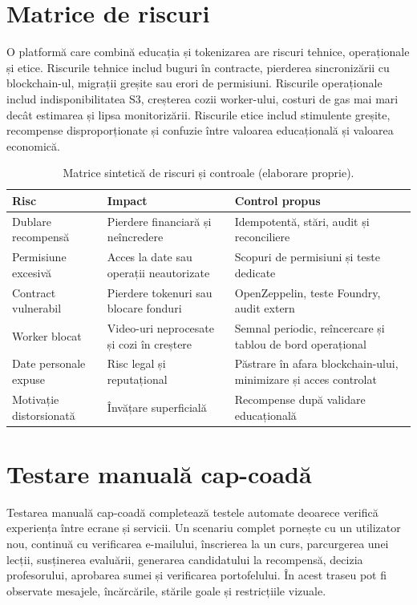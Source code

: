 \section{Matrice de riscuri}
O platformă care combină educația și tokenizarea are riscuri tehnice, operaționale și etice. Riscurile tehnice includ buguri în contracte, pierderea sincronizării cu blockchain-ul, migrații greșite sau erori de permisiuni. Riscurile operaționale includ indisponibilitatea S3, creșterea cozii worker-ului, costuri de gas mai mari decât estimarea și lipsa monitorizării. Riscurile etice includ stimulente greșite, recompense disproporționate și confuzie între valoarea educațională și valoarea economică.

\begin{table}[H]
    \centering
    \caption{Matrice sintetică de riscuri și controale (elaborare proprie).}
    \label{tab:matrice_riscuri}
    \begin{tabular}{P{3.6cm}P{4.8cm}P{5.2cm}}
        \toprule
        Risc & Impact & Control propus \\
        \midrule
        Dublare recompensă & Pierdere financiară și neîncredere & Idempotentă, stări, audit și reconciliere \\
        Permisiune excesivă & Acces la date sau operații neautorizate & Scopuri de permisiuni și teste dedicate \\
        Contract vulnerabil & Pierdere tokenuri sau blocare fonduri & OpenZeppelin, teste Foundry, audit extern \\
        Worker blocat & Video-uri neprocesate și cozi în creștere & Semnal periodic, reîncercare și tablou de bord operațional \\
        Date personale expuse & Risc legal și reputațional & Păstrare în afara blockchain-ului, minimizare și acces controlat \\
        Motivație distorsionată & Învățare superficială & Recompense după validare educațională \\
        \bottomrule
    \end{tabular}
\end{table}

\section{Testare manuală cap-coadă}
Testarea manuală cap-coadă completează testele automate deoarece verifică experiența între ecrane și servicii. Un scenariu complet pornește cu un utilizator nou, continuă cu verificarea e-mailului, înscrierea la un curs, parcurgerea unei lecții, susținerea evaluării, generarea candidatului la recompensă, decizia profesorului, aprobarea sumei și verificarea portofelului. În acest traseu pot fi observate mesajele, încărcările, stările goale și restricțiile vizuale.

